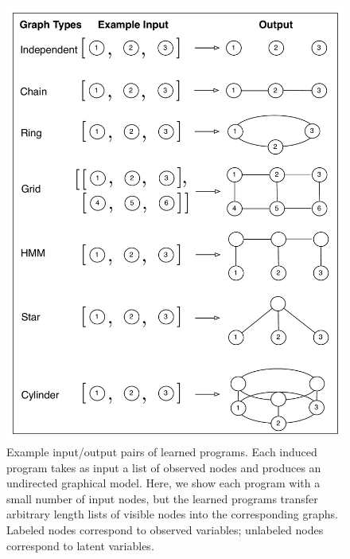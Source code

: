 \documentclass{article} %
\begin{document}
\begin{figure}[h]
\begin{minipage}[t]{.4\textwidth}
  \includegraphics[width=\linewidth]{./figures/tasks.pdf}
  \caption{Example input/output pairs of learned programs. Each induced program takes as input a list of observed nodes and produces an undirected graphical model. Here, we show each program with a small number of input nodes, but the learned programs transfer arbitrary length lists of visible nodes into the corresponding graphs. Labeled nodes correspond to observed variables; unlabeled nodes correspond to latent variables.}
  \label{fig:tasks}
\end{minipage}
\hspace{1cm}
\begin{minipage}[t]{.5\textwidth}

\end{minipage}
\end{figure}
\end{document}
